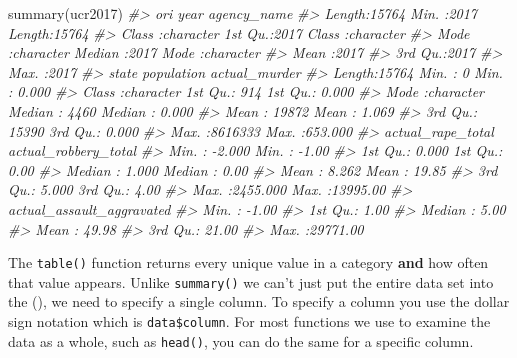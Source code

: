 \documentclass[
]{krantz}
\makeatletter
\newenvironment{Shaded}{\begin{snugshade}}{\end{snugshade}}
\newcommand{\CommentTok}[1]{\textcolor[rgb]{0.37,0.37,0.37}{\textit{#1}}}
\newcommand{\FunctionTok}[1]{\textcolor[rgb]{0,0,0}{#1}}
\newcommand{\NormalTok}[1]{#1}
\newenvironment{kframe}{%
\medskip{}
\setlength{\fboxsep}{.8em}
 \def\at@end@of@kframe{}%
 \ifinner\ifhmode%
  \def\at@end@of@kframe{\end{minipage}}%
  \begin{minipage}{\columnwidth}%
 \fi\fi%
 \def\FrameCommand##1{\hskip\@totalleftmargin \hskip-\fboxsep
 \colorbox{shadecolor}{##1}\hskip-\fboxsep
     \hskip-\linewidth \hskip-\@totalleftmargin \hskip\columnwidth}%
 \MakeFramed {\advance\hsize-\width
   \@totalleftmargin\z@ \linewidth\hsize
   \@setminipage}}%
 {\par\unskip\endMakeFramed%
 \at@end@of@kframe}
\renewenvironment{Shaded}{\begin{kframe}}{\end{kframe}}
\makeatother
\begin{document}
\begin{Shaded}
\begin{Highlighting}[]
\FunctionTok{summary}\NormalTok{(ucr2017)}
\CommentTok{\#\textgreater{}      ori                 year      agency\_name       }
\CommentTok{\#\textgreater{}  Length:15764       Min.   :2017   Length:15764      }
\CommentTok{\#\textgreater{}  Class :character   1st Qu.:2017   Class :character  }
\CommentTok{\#\textgreater{}  Mode  :character   Median :2017   Mode  :character  }
\CommentTok{\#\textgreater{}                     Mean   :2017                     }
\CommentTok{\#\textgreater{}                     3rd Qu.:2017                     }
\CommentTok{\#\textgreater{}                     Max.   :2017                     }
\CommentTok{\#\textgreater{}     state             population      actual\_murder    }
\CommentTok{\#\textgreater{}  Length:15764       Min.   :      0   Min.   :  0.000  }
\CommentTok{\#\textgreater{}  Class :character   1st Qu.:    914   1st Qu.:  0.000  }
\CommentTok{\#\textgreater{}  Mode  :character   Median :   4460   Median :  0.000  }
\CommentTok{\#\textgreater{}                     Mean   :  19872   Mean   :  1.069  }
\CommentTok{\#\textgreater{}                     3rd Qu.:  15390   3rd Qu.:  0.000  }
\CommentTok{\#\textgreater{}                     Max.   :8616333   Max.   :653.000  }
\CommentTok{\#\textgreater{}  actual\_rape\_total  actual\_robbery\_total}
\CommentTok{\#\textgreater{}  Min.   :  {-}2.000   Min.   :   {-}1.00    }
\CommentTok{\#\textgreater{}  1st Qu.:   0.000   1st Qu.:    0.00    }
\CommentTok{\#\textgreater{}  Median :   1.000   Median :    0.00    }
\CommentTok{\#\textgreater{}  Mean   :   8.262   Mean   :   19.85    }
\CommentTok{\#\textgreater{}  3rd Qu.:   5.000   3rd Qu.:    4.00    }
\CommentTok{\#\textgreater{}  Max.   :2455.000   Max.   :13995.00    }
\CommentTok{\#\textgreater{}  actual\_assault\_aggravated}
\CommentTok{\#\textgreater{}  Min.   :   {-}1.00         }
\CommentTok{\#\textgreater{}  1st Qu.:    1.00         }
\CommentTok{\#\textgreater{}  Median :    5.00         }
\CommentTok{\#\textgreater{}  Mean   :   49.98         }
\CommentTok{\#\textgreater{}  3rd Qu.:   21.00         }
\CommentTok{\#\textgreater{}  Max.   :29771.00}
\end{Highlighting}
\end{Shaded}

The \texttt{table()} function returns every unique value in
a category \textbf{and} how often that value appears. Unlike
\texttt{summary()} we can't just put the entire data set
into the (), we need to specify a single column. To specify
a column you use the dollar sign notation which is
\texttt{data\$column}. For most functions we use to examine
the data as a whole, such as \texttt{head()}, you can do the
same for a specific column.
\end{document}
